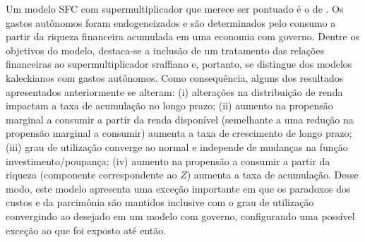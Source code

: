 Um modelo SFC com supermultiplicador que merece ser pontuado é o de \textcite{brochier_supermultiplier_2018}. Os gastos autônomos foram endogeneizados e são determinados pelo consumo a partir da riqueza financeira acumulada em uma economia com governo. Dentre os objetivos do modelo, destaca-se a inclusão de um tratamento das relações financeiras ao supermultiplicador sraffiano e, portanto, se distingue dos modelos kaleckianos com gastos autônomos. Como consequência, alguns dos resultados apresentados anteriormente se alteram: (i) alterações na distribuição de renda impactam a taxa de acumulação no longo prazo; (ii) aumento na propensão marginal a consumir a partir da renda disponível (semelhante a uma redução na propensão marginal a consumir) aumenta a taxa de crescimento de longo prazo; (iii) grau de utilização converge ao normal e independe de mudanças na função investimento/poupança; (iv) aumento na propensão a consumir a partir da riqueza (componente correspondente ao $Z$) aumenta a taxa de acumulação. Desse modo, este modelo apresenta uma exceção importante em que os paradoxos dos custos e da parcimônia são mantidos inclusive com o grau de utilização convergindo ao desejado em um modelo com governo, configurando uma possível exceção ao que foi exposto até então.



